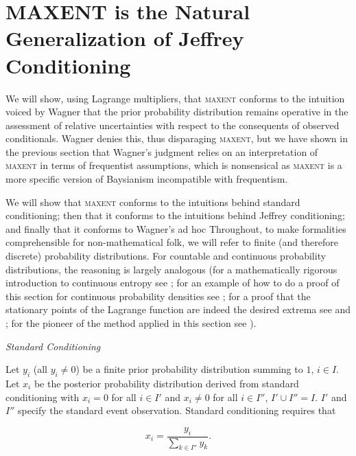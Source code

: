 \documentclass[11pt]{article}
\begin{document}
\section{MAXENT is the Natural Generalization of Jeffrey Conditioning}
\label{maxjeff}

We will show, using Lagrange multipliers, that \textsc{maxent}
conforms to the intuition voiced by Wagner that the prior probability
distribution remains operative in the assessment of relative
uncertainties with respect to the consequents of observed
conditionals. Wagner denies this, thus disparaging \textsc{maxent},
but we have shown in the previous section that Wagner's judgment
relies on an interpretation of \textsc{maxent} in terms of frequentist
assumptions, which is nonsensical as \textsc{maxent} is a more specific
version of Baysianism incompatible with frequentism. 

We will show that \textsc{maxent} conforms to the intuitions behind
standard conditioning; then that it conforms to the intuitions behind
Jeffrey conditioning; and finally that it conforms to Wagner's ad hoc
 Throughout, to
make formalities comprehensible for non-mathematical folk, we will
refer to finite (and therefore discrete) probability distributions.
For countable and continuous probability distributions, the reasoning
is largely analogous (for a mathematically rigorous introduction to
continuous entropy see ; for an example of
how to do a proof of this section for continuous probability densities
see ; for a proof that the stationary
points of the Lagrange function are indeed the desired extrema see
 and ; for the
pioneer of the method applied in this section see
).

\medskip

{\noindent}\emph{Standard Conditioning}

\medskip

{\noindent}Let $y_{i}$ (all $y_{i}\neq{}0$) be a finite prior
probability distribution summing to $1$, $i\in{}I$. Let $x_{i}$ be the
posterior probability distribution derived from standard conditioning
with $x_{i}=0$ for all $i\in{}I'$ and $x_{i}\neq{}0$ for all
$i\in{}I''$, $I'\cup{}I''=I$. $I'$ and $I''$ specify the standard
event observation. Standard conditioning requires that

\begin{equation}
  \label{eq:sc}
  x_{i}=\frac{y_{i}}{\sum_{k\in{}I''}y_{k}}.
\end{equation}
\end{document}
